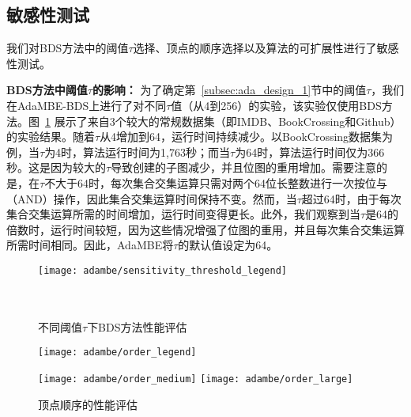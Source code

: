 \subsection{敏感性测试}
\label{subsec:ada_eval_sensitivity}

我们对BDS方法中的阈值$\tau$选择、顶点的顺序选择以及算法的可扩展性进行了敏感性测试。




\textbf{BDS方法中阈值$\tau$的影响：} 为了确定第~\ref{subsec:ada_design_1}节中的阈值$\tau$，我们在AdaMBE-BDS上进行了对不同$\tau$值（从4到256）的实验，该实验仅使用BDS方法。图~\ref{fig:ada_sensitivity_threshold} 展示了来自3个较大的常规数据集（即IMDB、BookCrossing和Github）的实验结果。随着$\tau$从4增加到64，运行时间持续减少。以BookCrossing数据集为例，当$\tau$为4时，算法运行时间为1,763秒；而当$\tau$为64时，算法运行时间仅为366秒。这是因为较大的$\tau$导致创建的子图减少，并且位图的重用增加。需要注意的是，在$\tau$不大于64时，每次集合交集运算只需对两个64位长整数进行一次按位与（AND）操作，因此集合交集运算时间保持不变。然而，当$\tau$超过64时，由于每次集合交集运算所需的时间增加，运行时间变得更长。此外，我们观察到当$\tau$是64的倍数时，运行时间较短，因为这些情况增强了位图的重用，并且每次集合交集运算所需时间相同。因此，AdaMBE将$\tau$的默认值设定为64。


\begin{figure} [H]
	\centering
  \texttt{[image: adambe/sensitivity\_threshold\_legend]} \\
	
	\\
	\\

	\caption{不同阈值$\tau$下BDS方法性能评估}
	\label{fig:ada_sensitivity_threshold}

\end{figure}


\begin{figure} [H]
	\centering
	
  \texttt{[image: adambe/order\_legend]}
  

		\texttt{[image: adambe/order\_medium]}
  \quad
		\texttt{[image: adambe/order\_large]}

	\caption{顶点顺序的性能评估}
	\label{fig:ada_order}

\end{figure}

